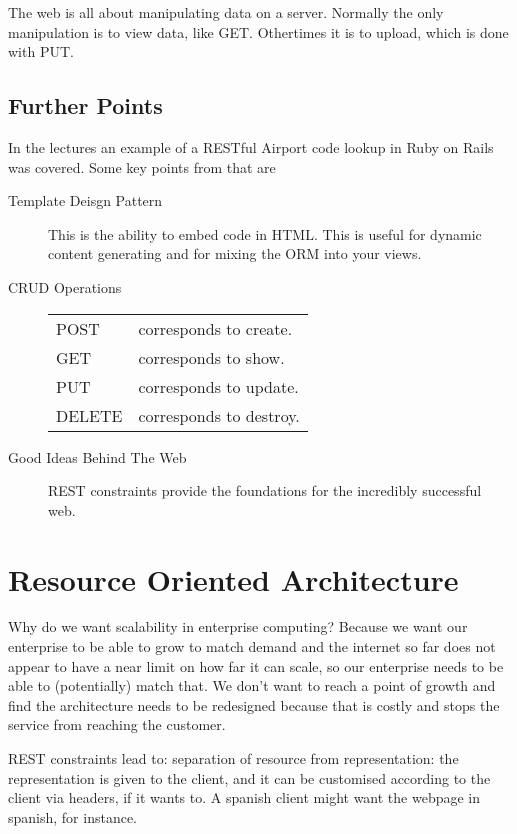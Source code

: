 \documentclass[11pt]{article}
\begin{document}
The web is all about manipulating data on a server. Normally the only manipulation is to view data, like GET. Othertimes it is to upload, which is done with PUT.

\subsection{Further Points}
In the lectures an example of a RESTful Airport code lookup in Ruby on Rails was covered. Some key points from that are
\begin{description}
  \item[Template Deisgn Pattern] This is the ability to embed code in HTML. This is useful for dynamic content generating and for mixing the ORM into your views.
  \item[CRUD Operations]
  \begin{tabular}{l l}
    POST & corresponds to create. \\
    GET & corresponds to show. \\
    PUT & corresponds to update. \\
    DELETE & corresponds to destroy. \\
  \end{tabular}
  \item[Good Ideas Behind The Web] REST constraints provide the foundations for the incredibly successful web.
\end{description}


\section{Resource Oriented Architecture}

Why do we want scalability in enterprise computing? Because we want our enterprise to be able to grow to match demand and the internet so far does not appear to have a near limit on how far it can scale, so our enterprise needs to be able to (potentially) match that. We don’t want to reach a point of growth and find the architecture needs to be redesigned because that is costly and stops the service from reaching the customer.

REST constraints lead to:
separation of resource from representation: the representation is given to the client, and it can be customised according to the client via headers, if it wants to. A spanish client might want the webpage in spanish, for instance.
\end{document}
